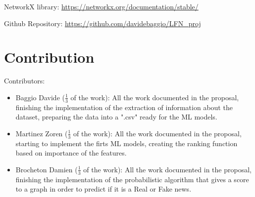 \documentclass[11pt,a4paper]{article}
\begin{document}
\newpage

\begin{thebibliography}{9}
	 NetworkX library: \url{https://networkx.org/documentation/stable/}

	 Github Repository: \url{https://github.com/davidebaggio/LFN_proj}
\end{thebibliography}

\newpage

\section*{Contribution}
Contributors:
\begin{itemize}
	\setlength\itemsep{-0.3em}
	\item Baggio Davide ($\frac{1}{3}$ of the work): All the work documented in the proposal, finishing the implementation of the extraction of information about the dataset, preparing the data into a ".csv" ready for the ML models.
	\item Martinez Zoren ($\frac{1}{3}$ of the work): All the work documented in the proposal, starting to implement the firts ML models, creating the ranking function based on importance of the features.
	\item Brocheton Damien ($\frac{1}{3}$ of the work): All the work documented in the proposal, finishing the implementation of the probabilistic algorithm that gives a score to a graph in order to predict if it is a Real or Fake news.
\end{itemize}
\end{document}
